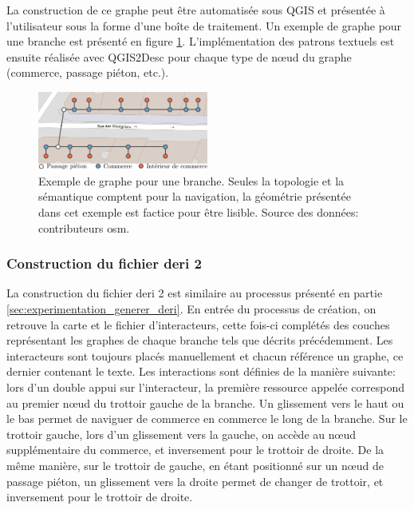 \newpar{}

La construction de ce graphe peut être automatisée sous QGIS et présentée à l'utilisateur sous la forme d'une boîte de traitement. Un exemple de graphe pour une branche est présenté en figure \ref{fig:experimentation_deri2_graphe_branche}. L'implémentation des patrons textuels est ensuite réalisée avec QGIS2Desc pour chaque type de nœud du graphe (commerce, passage piéton, etc.).

\begin{figure}[ht]
    \centering
    \includegraphics[width=0.5\textwidth]{images/experimentation/exemple_graphe_poc2.pdf}
    \caption[Exemple de graphe de description de branche]{Exemple de graphe pour une branche. Seules la topologie et la sémantique comptent pour la navigation, la géométrie présentée dans cet exemple est factice pour être lisible. Source des données: contributeurs \gls{osm}.}
    \label{fig:experimentation_deri2_graphe_branche}
\end{figure}

\subsubsection{Construction du fichier \gls{deri} 2}

La construction du fichier \gls{deri} 2 est similaire au processus présenté en partie \ref{sec:experimentation_generer_deri}. En entrée du processus de création, on retrouve la carte et le fichier d'interacteurs, cette fois-ci complétés des couches représentant les graphes de chaque branche tels que décrits précédemment. Les interacteurs sont toujours placés manuellement et chacun référence un graphe, ce dernier contenant le texte. Les interactions sont définies de la manière suivante: lors d'un double appui sur l'interacteur, la première ressource appelée correspond au premier nœud du trottoir gauche de la branche. Un glissement vers le haut ou le bas permet de naviguer de commerce en commerce le long de la branche. Sur le trottoir gauche, lors d'un glissement vers la gauche, on accède au nœud supplémentaire du commerce, et inversement pour le trottoir de droite. De la même manière, sur le trottoir de gauche, en étant positionné sur un nœud de passage piéton, un glissement vers la droite permet de changer de trottoir, et inversement pour le trottoir de droite.

